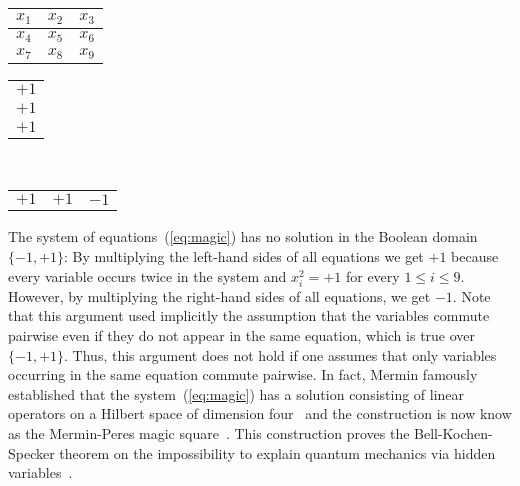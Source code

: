 \begin{center}
{\large
\begin{tabular}{|c|c|c|}
 \hline
  $x_1$ & $x_2$ & $x_3$ \\\hline 
  $x_4$ & $x_5$ & $x_6$ \\\hline 
  $x_7$ & $x_8$ & $x_9$ \\\hline
\end{tabular}
}
\begin{tabular}{c}
    $+1$\\
    $+1$\\
    $+1$
\end{tabular}
\\[-0.7em]
\begin{tabular}{ccc}
  $+1$ & $+1$ & $-1$
\end{tabular}
\end{center}
\vspace*{-1.2em}
%
The system of equations~(\ref{eq:magic}) has no solution in the Boolean domain
$\{-1,+1\}$: By multiplying the left-hand sides of all equations we get $+1$
because every variable occurs twice in the system and $x_i^2=+1$ for every
$1\leq i\leq 9$. However, by multiplying the right-hand sides of all equations,
we get $-1$. Note that this argument used implicitly the assumption that the
variables commute pairwise even if they do not appear in the same equation,
which is true over $\{-1,+1\}$.
Thus, this argument does not hold if one assumes that 
only variables occurring
in the same equation commute pairwise. In fact, Mermin famously established that
the system~(\ref{eq:magic}) has a solution consisting of linear operators on a
Hilbert space of dimension four~\cite{Mermin1990simple,Mermin1993hidden} and the
construction is now know as the Mermin-Peres magic
square~\cite{Peres1990incompatible}. This construction proves the
Bell-Kochen-Specker theorem on the impossibility to explain quantum
mechanics via hidden variables~\cite{Bell1966problem,Kochen67}. 

